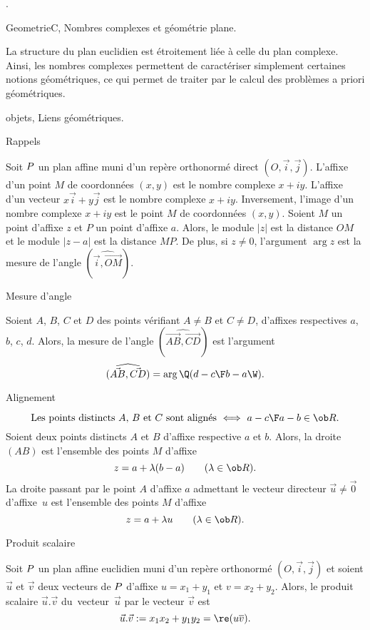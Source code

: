 . 

\medskip

\Section GeometrieC, Nombres complexes et g\'eom\'etrie plane. 


La structure du plan euclidien est \'etroitement li\'ee \`a celle du plan complexe. Ainsi, 
les nombres complexes permettent de caract\'eriser simplement certaines notions g\'eo\-m\'e\-tri\-ques, 
ce qui permet de traiter par le calcul 
des probl\`emes a priori g\'eom\'etriques. 
\bigskip


\Subsection objets, Liens g\'eom\'etriques. 

\Concept [] Rappels

\noindent
Soit $\sc P$ un plan affine muni d'un rep\`ere orthonorm\'e direct $(O,\vec i,\vec j)$. \pn
{L'affixe d'un point} $M$ de coordonn\'ees $(x,y)$ est le nombre complexe $x+i y$.\pn
{L'affixe d'un vecteur} $x\vec i+y\vec j$ est le nombre complexe $x+iy$. \pn
Inversement, {l'image d'un nombre complexe} $x+iy$ est le point $M$ de coordonn\'ees $(x,y)$. \pn
Soient $M$ un point d'affixe $z$ et $P$ un point d'affixe $a$. \pn
Alors, le module {$|z|$ est la distance $OM$} 
et le module {$|z-a|$ est la distance $MP$}. \pn
De plus, si $z\neq0$, l'argument {$\arg z$ est la mesure de l'angle $(\widehat{\vec i,\vec {OM}})$}.



\Concept [] Mesure d'angle

\noindent
Soient $A$, $B$, $C$ et $D$ des points v\'erifiant $A\neq B$ et $C\neq D$, d'affixes respectives $a$, $b$, $c$, $d$. \pn
Alors, la mesure de l'angle $(\widehat{\vec{AB},\vec {CD}})$ est l'argument 
$$
{(\widehat{\vec{AB},\vec {CD}})=\arg\Q({d-c\F b-a}\W)}.
$$

\Concept [] Alignement

$$
{\mbox{Les points distincts $A$, $B$ et $C$ sont align\'es}\ \Longleftrightarrow\ {a-c\F a-b}\in\ob R}. 
$$
\medskip\noindent
Soient deux points distincts $A$ et $B$ d'affixe respective $a$ et $b$. Alors, la droite $(AB)$ est l'ensemble des points $M$ d'affixe 
$$
z=a+\lambda (b-a)\qquad(\lambda\in\ob R).
$$
La droite passant par le point $A$ d'affixe $a$ admettant le vecteur directeur $\vec u\neq\vec0$ d'affixe~$u$ est l'ensemble des points $M$ d'affixe 
$$
z=a+\lambda u\qquad(\lambda\in\ob R).
$$


\Concept [] Produit scalaire

\noindent
Soit $\sc P$ un plan affine euclidien muni d'un rep\`ere orthonorm\'e $(O,\vec i,\vec j)$ et soient $\vec u$ et $\vec v$ deux vecteurs de $\sc P$ d'affixe $u=x_1+y_1$ et $v=x_2+y_2$. 
Alors, le produit scalaire $\vec u.\vec v$ du~vecteur~$\vec u$ par le vecteur $\vec v$ est 
$$
{\vec u.\vec v:=x_1x_2+y_1y_2=\re(u\overline v)}.
$$

